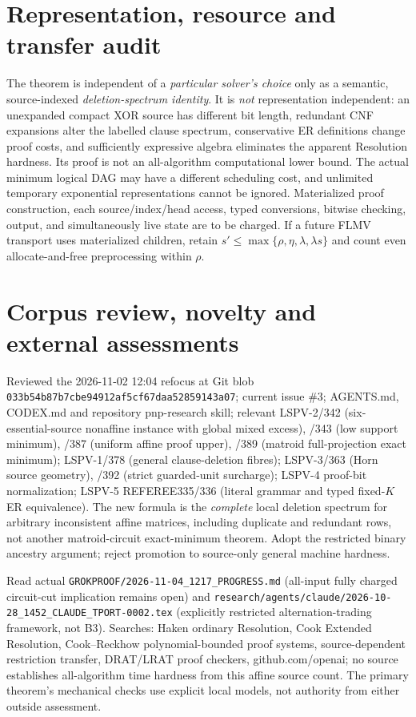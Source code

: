 \documentclass[11pt]{article}
\begin{document}
\section*{Representation, resource and transfer audit}
The theorem is independent of a \emph{particular solver's choice} only as a semantic, source-indexed \emph{deletion-spectrum identity}. It is \emph{not} representation independent: an unexpanded compact XOR source has different bit length, redundant CNF expansions alter the labelled clause spectrum, conservative ER definitions change proof costs, and sufficiently expressive algebra eliminates the apparent Resolution hardness. Its proof is not an all-algorithm computational lower bound. The actual minimum logical DAG may have a different scheduling cost, and unlimited temporary exponential representations cannot be ignored. Materialized proof construction, each source/index/head access, typed conversions, bitwise checking, output, and simultaneously live state are to be charged. If a future FLMV transport uses materialized children, retain $s'\le\max\{\rho,\eta,\lambda,\lambda s\}$ and count even allocate-and-free preprocessing within $\rho$.

\section*{Corpus review, novelty and external assessments}
Reviewed the 2026-11-02 12:04 refocus at Git blob \texttt{033b54b87b7cbe94912af5cf67daa52859143a07}; current issue \#3; AGENTS.md, CODEX.md and repository pnp-research skill; relevant LSPV-2/342 (six-essential-source nonaffine instance with global mixed excess), /343 (low support minimum), /387 (uniform affine proof upper), /389 (matroid full-projection exact minimum); LSPV-1/378 (general clause-deletion fibres); LSPV-3/363 (Horn source geometry), /392 (strict guarded-unit surcharge); LSPV-4 proof-bit normalization; LSPV-5 REFEREE335/336 (literal grammar and typed fixed-$K$ ER equivalence). The new formula is the \emph{complete} local deletion spectrum for arbitrary inconsistent affine matrices, including duplicate and redundant rows, not another matroid-circuit exact-minimum theorem. Adopt the restricted binary ancestry argument; reject promotion to source-only general machine hardness.

Read actual \texttt{GROKPROOF/2026-11-04\_1217\_PROGRESS.md} (all-input fully charged circuit-cut implication remains open) and \texttt{research/agents/claude/2026-10-28\_1452\_CLAUDE\_TPORT-0002.tex} (explicitly restricted alternation-trading framework, not B3). Searches: Haken ordinary Resolution, Cook Extended Resolution, Cook--Reckhow polynomial-bounded proof systems, source-dependent restriction transfer, DRAT/LRAT proof checkers, github.com/openai; no source establishes all-algorithm time hardness from this affine source count. The primary theorem's mechanical checks use explicit local models, not authority from either outside assessment.
\end{document}
